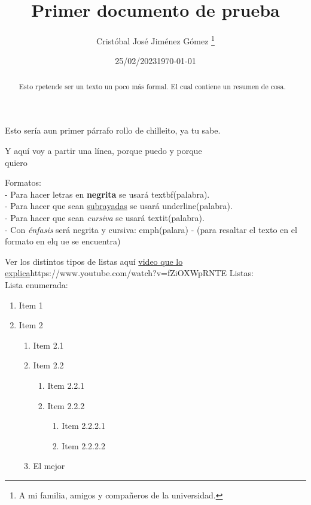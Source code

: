 \documentclass[11pt]{article}   %
\title{Primer documento de prueba}   %
\author{Cristóbal José Jiménez Gómez %
    \thanks{A mi familia, amigos y compañeros de la universidad.}}  %
\date{25/02/2023} %
\date{\today} %
\begin{document}

    \begin{titlepage}   %
        \maketitle
    \end{titlepage}     %

    Esto sería aun primer párrafo rollo de chilleito, ya tu sabe.

    \begin{abstract}
        Esto rpetende ser un texto un poco más formal. El cual contiene un resumen de cosa.
    \end{abstract}

    Y aquí voy a partir una línea, porque puedo y porque \\ quiero

    Formatos:\\
    - Para hacer letras en \textbf{negrita} se usará textbf(palabra).\\
    - Para hacer que sean \underline{subrayadas} se usará underline(palabra).\\
    - Para hacer que sean \textit{cursiva} se usará textit(palabra).\\
    - Con \emph{énfasis} será negrita y cursiva: emph(palara) - (para resaltar el texto en el formato en elq ue se encuentra)


    Ver los distintos tipos de listas aquí \url{video que lo explica}{https://www.youtube.com/watch?v=fZiOXWpRNTE}
    Listas:\\
    Lista enumerada:
    \begin{enumerate}
        \item Item 1
        \item Item 2
        \begin{enumerate}
            \item Item 2.1
            \item Item 2.2
            \begin{enumerate}
                \item Item 2.2.1
                \item Item 2.2.2
                \begin{enumerate}
                    \item Item 2.2.2.1
                    \item Item 2.2.2.2
                \end{enumerate}
            \end{enumerate}
            \item El mejor
        \end{enumerate}
    \end{enumerate}
\end{document}
